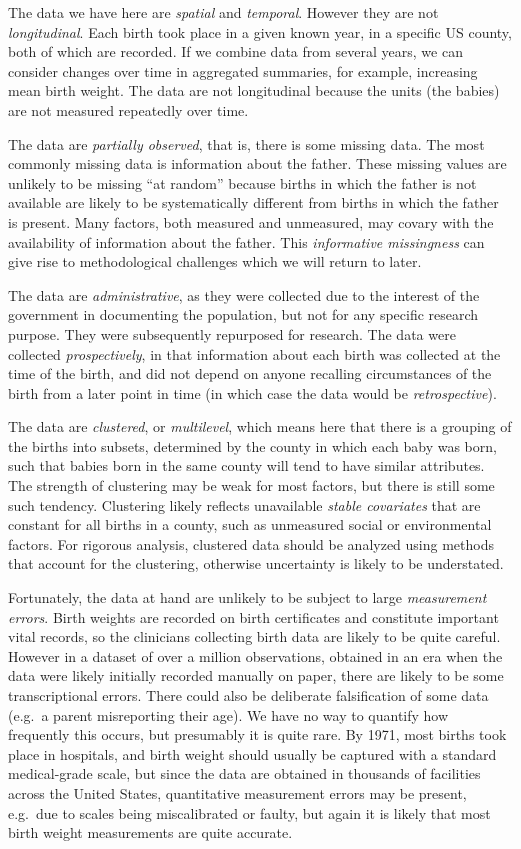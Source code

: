 The data we have here are {\em spatial} and {\em temporal}.  However they are not {\em longitudinal}. Each birth took place in a given known year, in a specific US county, both of which are recorded.  If we combine data from several years, we can consider changes over time in aggregated summaries, for example, increasing mean birth weight.  The data are not longitudinal because the units (the babies) are not measured repeatedly over time.

The data are {\em partially observed}, that is, there is some missing data.  The most commonly missing data is information about the father.  These missing values are unlikely to be missing ``at random'' because births in which the father is not available are likely to be systematically different from births in which the father is present.  Many factors, both measured and unmeasured, may covary with the availability of information about the father.  This {\em informative missingness} can give rise to methodological challenges which we will return to later.

The data are {\em administrative}, as they were collected due to the interest of the government in documenting the population, but not for any specific research purpose.  They were subsequently repurposed for research.  The data were collected {\em prospectively}, in that information about each birth was collected at the time of the birth, and did not depend on anyone recalling circumstances of the birth from a later point in time (in which case the data would be {\em retrospective}).

The data are {\em clustered}, or {\em multilevel}, which means here that there is a grouping of the births into subsets, determined by the county in which each baby was born, such that babies born in the same county will tend to have similar attributes.  The strength of clustering may be weak for most factors, but there is still some such tendency.  Clustering likely reflects unavailable {\em stable covariates} that are constant for all births in a county, such as unmeasured social or environmental factors.  For rigorous analysis, clustered data should be analyzed using methods that account for the clustering, otherwise uncertainty is likely to be understated.

Fortunately, the data at hand are unlikely to be subject to large {\em measurement errors}. Birth weights are recorded on birth certificates and constitute important vital records, so the clinicians collecting birth data are likely to be quite careful.  However in a dataset of over a million observations, obtained in an era when the data were likely initially recorded manually on paper, there are likely to be some transcriptional errors.  There could also be deliberate falsification of some data (e.g.\ a parent misreporting their age).  We have no way to quantify how frequently this occurs, but presumably it is quite rare.  By 1971, most births took place in hospitals, and birth weight should usually be captured with a standard medical-grade scale, but since the data are obtained in thousands of facilities across the United States, quantitative measurement errors may be present, e.g.\ due to scales being miscalibrated or faulty, but again it is likely that most birth weight measurements are quite accurate.

